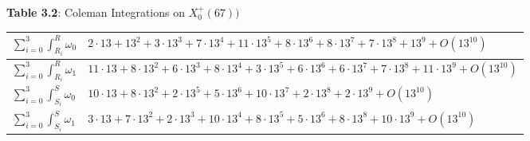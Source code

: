 \begin{itemize}
    \begin{center}
    \textbf{Table 3.2}: Coleman Integrations on $X_0^+(67))$
    \end{center}
\begin{table}[h]

    \centering
    \begin{tabular}{|l|l|}
    \hline
    \rule{0pt}{4ex}    

        $\sum_{i=0}^{3}\int^R_{R_i} \omega_0 $    & $2\cdot 13 + 13^2 + 3\cdot 13^3 + 7\cdot 13^4 + 11\cdot 13^5 + 8\cdot 13^6 + 8\cdot 13^7 + 7\cdot 13^8 + 13^9 +  O(13^{10})$ 
            \rule{0pt}{4ex} \\
\hline
            \rule{0pt}{4ex}
        $\sum_{i=0}^{3}\int^R_{R_i} \omega_1 $  & $11\cdot 13 + 8\cdot 13^2 + 6\cdot 13^3 + 8\cdot 13^4 + 3\cdot 13^5+ 6\cdot 13^6 + 6\cdot 13^7 + 7\cdot 13^8 + 11\cdot 13^9 + O(13^{10}) $
            \rule{0pt}{4ex}
\\\hline
            \rule{0pt}{4ex}
       $\sum_{i=0}^{3}\int^S_{S_i} \omega_0 $ & $10\cdot  13 + 8\cdot 13^2 + 2\cdot 13^5 + 5\cdot 13^6 + 10\cdot 13^7 + 2\cdot 13^8 + 2\cdot 13^9+ O(13^{10}) $   \rule{0pt}{4ex}    
\\\hline
           \rule{0pt}{4ex}    
        $\sum_{i=0}^{3}\int^S_{S_i} \omega_1 $ &  $3\cdot 13 + 7\cdot 13^2 + 2\cdot 13^3 + 10\cdot 13^4 + 8\cdot 13^5+ 5\cdot 13^6 + 8\cdot 13^8 + 10\cdot 13^9+ O(13^{10}) $   \rule{0pt}{4ex}    
\\\hline
        
    \end{tabular}

    \label{table:X_0^+(67)_results}
\end{table}

\end{itemize}
